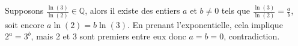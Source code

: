 Supposons $\frac{\ln(3)}{\ln(2)}\in\mathbb{Q}$, alors il existe des entiers $a$ et $b\neq 0$ tels que $\frac{\ln(3)}{\ln(2)}=\frac{a}{b}$, soit encore $a\ln(2)=b\ln(3)$. En prenant l'exponentielle, cela implique $2^a=3^b$, mais 2 et 3 sont premiers entre eux donc $a=b=0$, contradiction.
